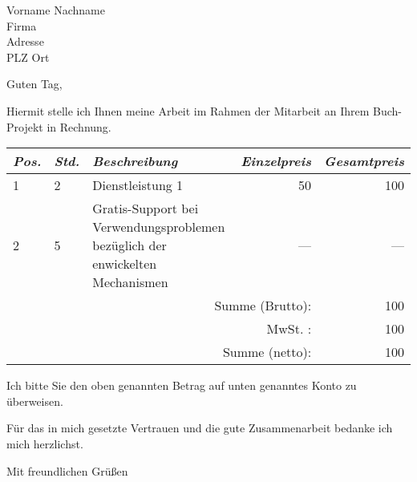 \documentclass[%
	parskip=half*,
	ngerman,
]{scrartcl}
\begin{document}
	
	\begin{letter}{Vorname Nachname\\Firma\\Adresse\\PLZ Ort}
		\opening{Guten Tag,}
		
		Hiermit stelle ich Ihnen meine Arbeit im Rahmen der Mitarbeit an Ihrem Buch-Projekt in Rechnung.

		\begin{tabularx}{\linewidth}{@{}llXrr@{}}
			\toprule
			\emph{Pos.} & \emph{Std.} & \emph{Beschreibung}                                                           & \emph{Einzelpreis} & \emph{Gesamtpreis} \\ \midrule[\heavyrulewidth]
			1           & 2           & Dienstleistung 1                                                              &                 50 &                100 \\
			2           & 5           & Gratis-Support bei Verwendungsproblemen bezüglich der enwickelten Mechanismen &                --- &                --- \\ \midrule[\heavyrulewidth]
			                                                                                           \multicolumn{4}{r}{Summe (Brutto):} &                100 \\
			                                                                                            \multicolumn{4}{r}{MwSt. :} &                100 \\
			                                                                                            \multicolumn{4}{r}{Summe (netto):} &                100 \\ \bottomrule
		\end{tabularx}
	
		Ich bitte Sie den oben genannten Betrag auf unten genanntes Konto zu überweisen.

		Für das in mich gesetzte Vertrauen und die gute Zusammenarbeit bedanke ich mich herzlichst.
		\closing{Mit freundlichen Grüßen}
	\end{letter}
\end{document}
